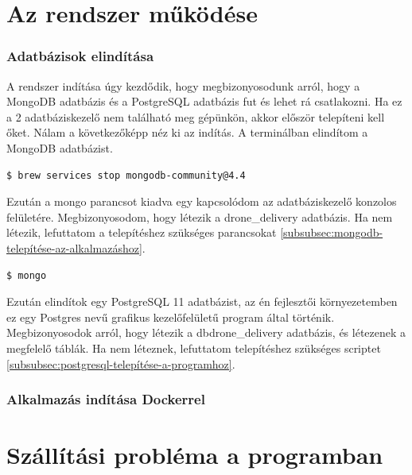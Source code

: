 

\section{Az rendszer működése}

\subsubsection{Adatbázisok elindítása}
A rendszer indítása úgy kezdődik, hogy megbizonyosodunk arról, hogy a MongoDB adatbázis és a PostgreSQL adatbázis fut és lehet rá csatlakozni.
Ha ez a 2 adatbáziskezelő nem található meg gépünkön, akkor először telepíteni kell őket.
Nálam a következőképp néz ki az indítás. A terminálban elindítom a MongoDB adatbázist.
\begin{lstlisting}[language=bash]
  $ brew services stop mongodb-community@4.4
\end{lstlisting}
Ezután a mongo parancsot kiadva egy kapcsolódom az adatbáziskezelő konzolos felületére.
Megbizonyosodom, hogy létezik a drone_delivery adatbázis.
Ha nem létezik, lefuttatom a telepítéshez szükséges parancsokat \ref{subsubsec:mongodb-telepítése-az-alkalmazáshoz}.
\begin{lstlisting}[language=bash]
  $ mongo
\end{lstlisting}


Ezután elindítok egy PostgreSQL 11 adatbázist, az én fejlesztői környezetemben ez egy Postgres nevű grafikus kezelőfelületű program által történik.
Megbizonyosodok arról, hogy létezik a dbdrone_delivery adatbázis, és létezenek a megfelelő táblák. Ha nem léteznek, lefuttatom telepítéshez szükséges scriptet \ref{subsubsec:postgresql-telepítése-a-programhoz}.

\subsubsection{Alkalmazás indítása Dockerrel}


\section{Szállítási probléma a programban}
